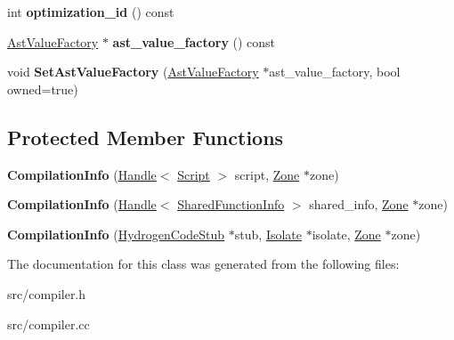 \begin{DoxyCompactItemize}
\item 
\hypertarget{classv8_1_1internal_1_1_compilation_info_a30b55d1964eed6b6ac7c5cb49f2aac5d}{}int {\bfseries optimization\+\_\+id} () const \label{classv8_1_1internal_1_1_compilation_info_a30b55d1964eed6b6ac7c5cb49f2aac5d}

\item 
\hypertarget{classv8_1_1internal_1_1_compilation_info_a12bc800e4091eb37fec2a2350bb91d19}{}\hyperlink{classv8_1_1internal_1_1_ast_value_factory}{Ast\+Value\+Factory} $\ast$ {\bfseries ast\+\_\+value\+\_\+factory} () const \label{classv8_1_1internal_1_1_compilation_info_a12bc800e4091eb37fec2a2350bb91d19}

\item 
\hypertarget{classv8_1_1internal_1_1_compilation_info_ab6e290fe2ebd529b09e201263bba98c1}{}void {\bfseries Set\+Ast\+Value\+Factory} (\hyperlink{classv8_1_1internal_1_1_ast_value_factory}{Ast\+Value\+Factory} $\ast$ast\+\_\+value\+\_\+factory, bool owned=true)\label{classv8_1_1internal_1_1_compilation_info_ab6e290fe2ebd529b09e201263bba98c1}

\end{DoxyCompactItemize}
\subsection*{Protected Member Functions}
\begin{DoxyCompactItemize}
\item 
\hypertarget{classv8_1_1internal_1_1_compilation_info_aa75fe813f345a6469c23a80be31bcfe0}{}{\bfseries Compilation\+Info} (\hyperlink{classv8_1_1internal_1_1_handle}{Handle}$<$ \hyperlink{classv8_1_1internal_1_1_script}{Script} $>$ script, \hyperlink{classv8_1_1internal_1_1_zone}{Zone} $\ast$zone)\label{classv8_1_1internal_1_1_compilation_info_aa75fe813f345a6469c23a80be31bcfe0}

\item 
\hypertarget{classv8_1_1internal_1_1_compilation_info_a610c070d65a099568a6e2bdcd3591780}{}{\bfseries Compilation\+Info} (\hyperlink{classv8_1_1internal_1_1_handle}{Handle}$<$ \hyperlink{classv8_1_1internal_1_1_shared_function_info}{Shared\+Function\+Info} $>$ shared\+\_\+info, \hyperlink{classv8_1_1internal_1_1_zone}{Zone} $\ast$zone)\label{classv8_1_1internal_1_1_compilation_info_a610c070d65a099568a6e2bdcd3591780}

\item 
\hypertarget{classv8_1_1internal_1_1_compilation_info_a9e4332450f2950d59cc87b5b37ee7850}{}{\bfseries Compilation\+Info} (\hyperlink{classv8_1_1internal_1_1_hydrogen_code_stub}{Hydrogen\+Code\+Stub} $\ast$stub, \hyperlink{classv8_1_1internal_1_1_isolate}{Isolate} $\ast$isolate, \hyperlink{classv8_1_1internal_1_1_zone}{Zone} $\ast$zone)\label{classv8_1_1internal_1_1_compilation_info_a9e4332450f2950d59cc87b5b37ee7850}

\end{DoxyCompactItemize}


The documentation for this class was generated from the following files\+:\begin{DoxyCompactItemize}
\item 
src/compiler.\+h\item 
src/compiler.\+cc\end{DoxyCompactItemize}
